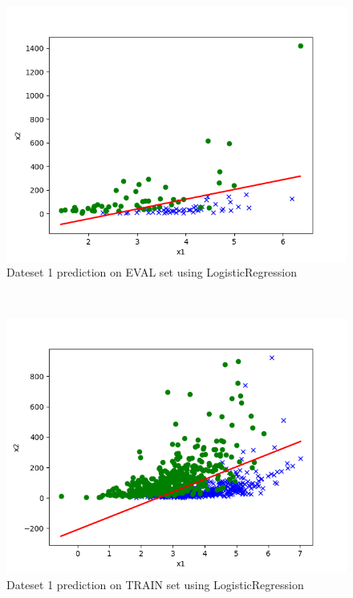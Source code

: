 \begin{answer}\\
\begin{figure}
  \includegraphics[width=\linewidth]{p01b_pred_1_eval.png}
  \caption{Dateset 1 prediction on EVAL set using LogisticRegression}
  \label{fig:Dateset 1 prediction on EVAL set using LogisticRegression}
\end{figure}\\
\begin{figure}
  \includegraphics[width=\linewidth]{p01b_pred_1_train.png}
  \caption{Dateset 1 prediction on TRAIN set using LogisticRegression}
  \label{fig:Dateset 1 prediction on TRAIN set using LogisticRegression}
\end{figure}\\

\end{answer}
